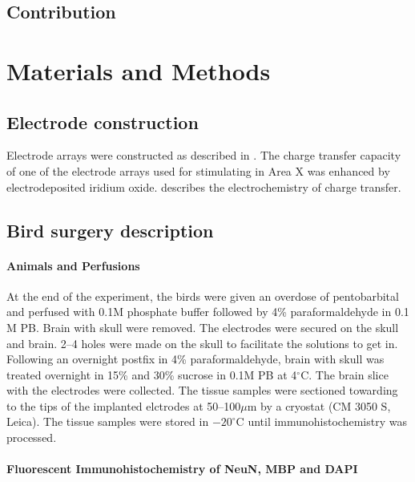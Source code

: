 \documentclass[10pt,letterpaper]{article}
\renewcommand{\subsubsection}[1]{\paragraph{#1}}
\begin{document}
\subsection{Contribution}



\section{Materials and Methods}

\subsection{Electrode construction}

Electrode arrays were constructed as described in
\cite{Guitchounts2013electrode}.  The charge transfer capacity of one
of the electrode arrays used for stimulating in Area X was enhanced by
electrodeposited iridium oxide.  \cite{Cogan2008electrodes} describes
the electrochemistry of charge transfer.

\subsection{Bird surgery description}

\subsubsection{Animals and Perfusions}

At the end of the experiment, the birds were given an overdose of
pentobarbital and perfused with 0.1M phosphate buffer followed by 4\%
paraformaldehyde in 0.1 M PB.  Brain with skull were removed. The
electrodes were secured on the skull and brain. 2--4 holes were made
on the skull to facilitate the solutions to get in. Following an
overnight postfix in 4\% paraformaldehyde, brain with skull was
treated overnight in 15\% and 30\% sucrose in 0.1M PB at 4$^\circ$C.
The brain slice with the electrodes were collected. The tissue samples
were sectioned towarding to the tips of the implanted elctrodes at
50--100$\mu$m by a cryostat (CM 3050 S, Leica). The tissue samples
were stored in $-20^\circ$C until immunohistochemistry was processed.

\subsubsection{Fluorescent Immunohistochemistry of NeuN, MBP and DAPI}
\end{document}
